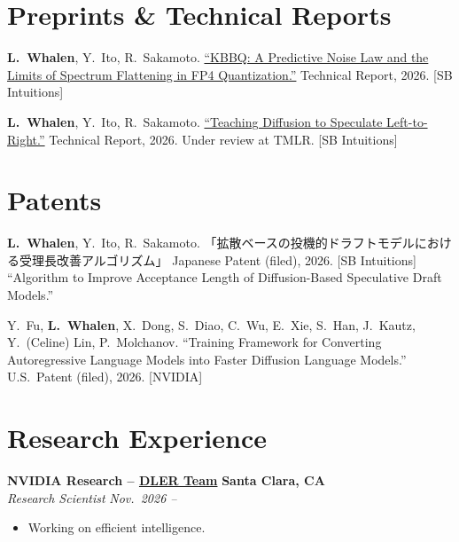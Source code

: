\documentclass[10pt,a4paper]{article}
\newcommand{\cvlink}[2]{\href{#1}{#2}}
\newcommand{\entry}[4]{%
  \noindent\textbf{#1} \hfill \textbf{#2}\\
  \textit{#3} \hfill \textit{#4}%
}
\begin{document}
\section{Preprints \& Technical Reports}
\begin{publist}
  \item \textbf{L.\ Whalen}, Y.\ Ito, R.\ Sakamoto. \href{https://arxiv.org/pdf/2609.08135}{``KBBQ: A Predictive Noise Law and the Limits of Spectrum Flattening in FP4 Quantization.''} Technical Report, 2026. [SB Intuitions]
  \item \textbf{L.\ Whalen}, Y.\ Ito, R.\ Sakamoto. \href{https://arxiv.org/pdf/2606.11552}{``Teaching Diffusion to Speculate Left-to-Right.''} Technical Report, 2026. Under review at TMLR. [SB Intuitions]
\end{publist}

\section{Patents}
\begin{publist}
  \item \textbf{L.\ Whalen}, Y.\ Ito, R.\ Sakamoto. 「拡散ベースの投機的ドラフトモデルにおける受理長改善アルゴリズム」 Japanese Patent (filed), 2026. [SB Intuitions]\\
  {\footnotesize ``Algorithm to Improve Acceptance Length of Diffusion-Based Speculative Draft Models.''}
  \item Y.\ Fu, \textbf{L.\ Whalen}, X.\ Dong, S.\ Diao, C.\ Wu, E.\ Xie, S.\ Han, J.\ Kautz, Y.\ (Celine) Lin, P.\ Molchanov. ``Training Framework for Converting Autoregressive Language Models into Faster Diffusion Language Models.'' U.S.\ Patent (filed), 2026. [NVIDIA]
\end{publist}

\section{Research Experience}

\entry{NVIDIA Research -- \cvlink{https://nv-dler.github.io/}{DLER Team}}{Santa Clara, CA}{Research Scientist}{Nov.\ 2026 --}
\begin{itemize}[leftmargin=*, nosep, itemsep=2pt, topsep=2pt]
  \item Working on efficient intelligence.
\end{itemize}
\end{document}
